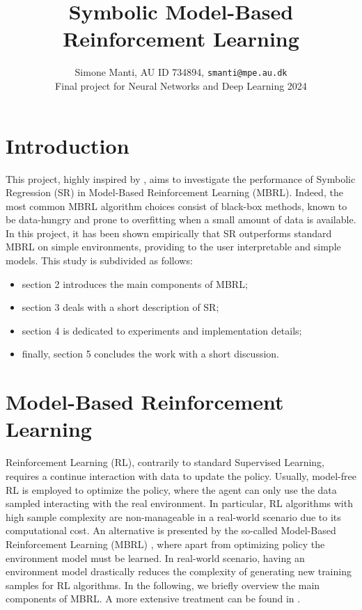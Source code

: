 \documentclass[11pt]{article}
\author{Simone Manti, AU ID 734894, \texttt{smanti@mpe.au.dk} \\
	Final project for Neural Networks and Deep Learning 2024}
\title{Symbolic Model-Based Reinforcement Learning}
\begin{document}
	\maketitle

\section{Introduction}
This project, highly inspired by \cite{kamienny2022symbolic}, aims to investigate the performance of Symbolic Regression (SR) in Model-Based Reinforcement Learning (MBRL). Indeed, the most common MBRL algorithm choices consist of black-box methods, known to be data-hungry and prone to overfitting when a small amount of data is available. In this project, it has been shown empirically that SR outperforms standard MBRL on simple environments, providing to the user interpretable and simple models.
This study is subdivided as follows:
\begin{itemize}
	\item section 2 introduces the main components of MBRL;
	\item section 3 deals with a short description of SR;
	\item section 4 is dedicated to experiments and implementation details;
	\item finally, section 5 concludes the work with a short discussion. 
\end{itemize}

\section{Model-Based Reinforcement Learning}
Reinforcement Learning (RL), contrarily to standard Supervised Learning, requires a continue interaction with data to update the policy. Usually, model-free RL is employed to optimize the policy, where the agent can only use the data sampled interacting with the real environment. In particular, RL algorithms with high sample complexity are non-manageable in a real-world scenario due to its computational cost. An alternative is presented by the so-called Model-Based Reinforcement Learning (MBRL) \cite{moerland2023model}, where apart from optimizing policy the environment model must be learned. In real-world scenario, having an environment model drastically reduces the complexity of generating new training samples for RL algorithms.
In the following, we briefly overview the main components of MBRL. A more extensive treatment can be found in \cite{moerland2023model, pineda2021mbrl,luo2024survey}. 
\end{document}
